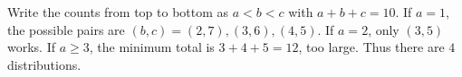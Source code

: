Write the counts from top to bottom as $a<b<c$ with $a+b+c=10$. If $a=1$, the possible pairs are $(b,c)=(2,7),(3,6),(4,5)$. If $a=2$, only $(3,5)$ works. If $a\ge3$, the minimum total is $3+4+5=12$, too large. Thus there are $\boxed4$ distributions.

